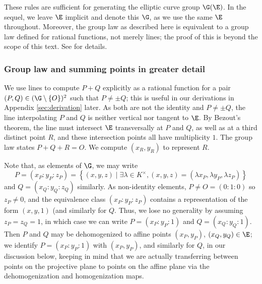 \documentclass[11pt,letterpaper]{article}
\theoremstyle{definition}
\newcommand{\6}{\mathbf}
\newcommand{\7}{\mathcal}
\begin{document}
These rules are sufficient for generating the elliptic curve group $\G(\E)$. In the sequel, we leave $\E$ implicit and denote this $\G$, as we use the same $\E$ throughout. Moreover, the group law as described here is equivalent to a group law defined for rational functions, not merely lines; the proof of this is beyond the scope of this text. See \cite{Silverman} for details.

\subsubsection{Group law and summing points in greater detail}\label{subsec:detail}

We use lines to compute $P + Q$ explicitly as a rational function for a pair $(P, Q) \in (\G \setminus \left\{O\right\})^2$ such that $P \neq \pm Q$; this is useful in our derivations in Appendix \ref{sec:derivation} later. As both are not the identity and $P \neq \pm Q$, the line interpolating $P$ and $Q$ is neither vertical nor tangent to $\E$. By Bezout's theorem, the line must intersect $\E$ transversally at $P$ and $Q$, as well as at a third distinct point $R$, and these intersection points all have multiplicity $1$. 
The group law states $P + Q + R = O$. 
We compute $(x_R, y_R)$ to represent $R$.


Note that, as elements of $\G$, we may write \[P = (x_P:y_P:z_P) = \left\{(x,y,z) \mid \exists \lambda \in K^\times, (x,y,z) = (\lambda x_P,\lambda y_P,\lambda z_P)\right\}\] and $Q = (x_Q:y_Q:z_Q)$ similarly. As non-identity elements, $P \neq O = (0:1:0)$ so $z_P \neq 0$, and the equivalence class $(x_P:y_P:z_P)$ contains a representation of the form $(x,y,1)$ (and similarly for $Q$. Thus, we lose no generality by assuming $z_P=z_Q=1$, in which case we can write $P = (x_P:y_P:1)$ and $Q=(x_Q:y_Q:1)$. Then $P$ and $Q$ may be dehomogenized to affine points $(x_P, y_P)$, $(x_Q, y_Q) \in \E$; we identify $P = (x_P:y_P:1)$ with $(x_P, y_P)$, and similarly for $Q$, in our discussion below, keeping in mind that we are actually transferring between points on the projective plane to points on the affine plane via the dehomogenization and homogenization maps.
\end{document}
